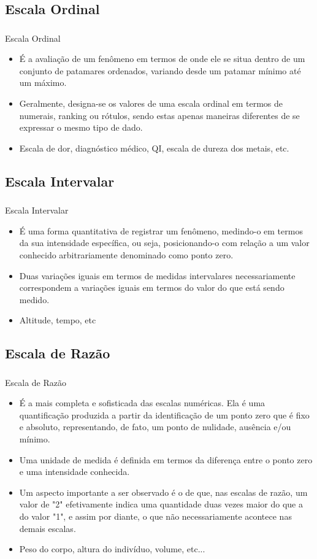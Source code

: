 \documentclass[10 pt]{beamer}
\newcommand{\makesubsection}[1]{\subsection[#1]{#1}}
\newcommand{\myframe}[1]{
\begin{frame}
 \frametitle{\insertsection \qquad {\small \insertsubsection}}
#1
\end{frame}}
\begin{document}
\makesubsection{Escala Ordinal}

\myframe {
  Escala Ordinal
  \begin{itemize}
    \item É a avaliação de um fenômeno em termos de onde ele se 
      situa dentro de um conjunto de patamares ordenados, 
      variando desde um patamar mínimo até um máximo. 
    \item Geralmente, designa-se os valores de uma escala ordinal 
      em termos de numerais, ranking ou rótulos, sendo estas apenas 
      maneiras diferentes de se expressar o mesmo tipo de dado. 
    \item Escala de dor, diagnóstico médico, QI, escala de dureza dos metais, etc.
  \end{itemize}
}

\makesubsection{Escala Intervalar}

\myframe {
  Escala Intervalar
  \begin{itemize}
    \item É uma forma quantitativa de registrar um fenômeno, medindo-o em 
      termos da sua intensidade específica, ou seja, posicionando-o com 
      relação a um valor conhecido arbitrariamente denominado como ponto zero. 
    \item Duas variações iguais em termos de medidas intervalares 
      necessariamente correspondem a variações iguais em termos do 
      valor do que está sendo medido. 
    \item Altitude, tempo, etc
  \end{itemize}
}

\makesubsection{Escala de Razão}

\myframe {
  Escala de Razão
  \begin{itemize}
    \item É a mais completa e sofisticada das escalas numéricas. 
      Ela é uma quantificação produzida a partir da identificação de 
      um ponto zero que é fixo e absoluto, representando, de fato, um 
      ponto de nulidade, ausência e/ou mínimo. 
    \item Uma unidade de medida é definida em termos da diferença entre 
      o ponto zero e uma intensidade conhecida. 
    \item Um aspecto importante a ser observado é o de que, nas escalas de 
      razão, um valor de "2" efetivamente indica uma quantidade duas vezes 
      maior do que a do valor "1", e assim por diante, o que não necessariamente 
      acontece nas demais escalas. 
    \item Peso do corpo, altura do indivíduo, volume, etc...
  \end{itemize}
}
\end{document}

